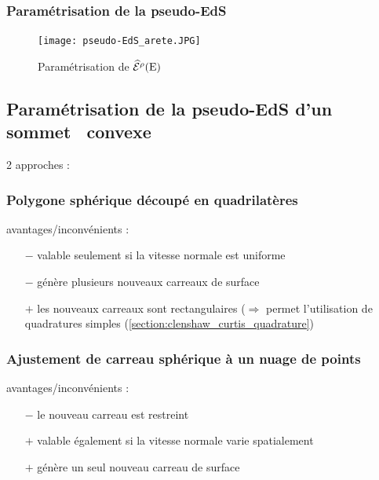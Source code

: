 \subsubsection{Paramétrisation de la pseudo-EdS}
\label{section:parametrisation_pseudo_EdS_arete}
\newcommand{\eosR}{\lo{\vit{\eos}}}
\newcommand{\eosL}{\hi{\vit{\eos}}}

\newcommand{\psiR}{\lo{\vit{\psi}}}
\newcommand{\psiL}{\hi{\vit{\psi}}}


\begin{figure}
    \centering
    \texttt{[image: pseudo-EdS\_arete.JPG]}
    \caption{Paramétrisation de $\widehat{\mathcal{E}}^{\rho}({\mathrm{E}})$}
    \label{fig:pseudo-EdS_arete}
\end{figure}






\subsection{Paramétrisation de la pseudo-EdS d'un sommet \brep\ convexe}
2 approches :

\subsubsection{Polygone sphérique découpé en quadrilatères}
\label{section:quadrangulation_polygone_spherique}
avantages/inconvénients :
\begin{itemize}
	\item[$-$] valable seulement si la vitesse normale est uniforme
	\item[$-$] génère plusieurs nouveaux carreaux de surface
	\item[$+$] les nouveaux carreaux sont rectangulaires ($\Rightarrow$ permet l'utilisation de quadratures simples (\cf \autoref{section:clenshaw_curtis_quadrature})
\end{itemize}


\subsubsection{Ajustement de carreau sphérique à un nuage de points}
\label{section:ajustement_carreau_spherique}

\def\s{\vit{s}}

avantages/inconvénients :
\begin{itemize}
	\item[$-$] le nouveau carreau est restreint
	\item[$+$] valable également si la vitesse normale varie spatialement
	\item[$+$] génère un seul nouveau carreau de surface
\end{itemize}

